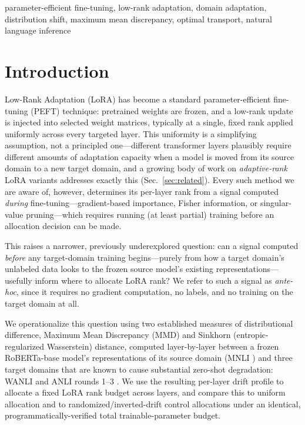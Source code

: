 \documentclass[conference]{IEEEtran}
\begin{document}
\begin{IEEEkeywords}
parameter-efficient fine-tuning, low-rank adaptation, domain adaptation, distribution shift, maximum mean discrepancy, optimal transport, natural language inference
\end{IEEEkeywords}

\section{Introduction}

Low-Rank Adaptation (LoRA) \cite{hu2021lora} has become a standard parameter-efficient fine-tuning (PEFT) technique: pretrained weights are frozen, and a low-rank update is injected into selected weight matrices, typically at a single, fixed rank applied uniformly across every targeted layer. This uniformity is a simplifying assumption, not a principled one---different transformer layers plausibly require different amounts of adaptation capacity when a model is moved from its source domain to a new target domain, and a growing body of work on \emph{adaptive-rank} LoRA variants addresses exactly this (Sec.~\ref{sec:related}). Every such method we are aware of, however, determines its per-layer rank from a signal computed \emph{during} fine-tuning---gradient-based importance, Fisher information, or singular-value pruning---which requires running (at least partial) training before an allocation decision can be made.

This raises a narrower, previously underexplored question: can a signal computed \emph{before} any target-domain training begins---purely from how a target domain's unlabeled data looks to the frozen source model's existing representations---usefully inform where to allocate LoRA rank? We refer to such a signal as \emph{ante-hoc}, since it requires no gradient computation, no labels, and no training on the target domain at all.

We operationalize this question using two established measures of distributional difference, Maximum Mean Discrepancy (MMD) and Sinkhorn (entropic-regularized Wasserstein) distance, computed layer-by-layer between a frozen RoBERTa-base model's representations of its source domain (MNLI \cite{williams2018mnli}) and three target domains that are known to cause substantial zero-shot degradation: WANLI \cite{liu2022wanli} and ANLI rounds 1--3 \cite{nie2020anli}. We use the resulting per-layer drift profile to allocate a fixed LoRA rank budget across layers, and compare this to uniform allocation and to randomized/inverted-drift control allocations under an identical, programmatically-verified total trainable-parameter budget.
\end{document}
